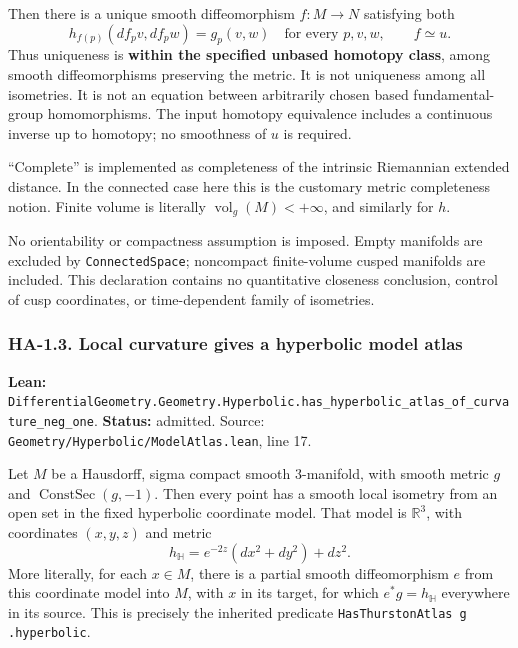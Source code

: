 \documentclass[
  letterpaper,
  11pt]{article}
\begin{document}
Then there is a unique smooth diffeomorphism \(f:M\to N\) satisfying
both \[
 h_{f(p)}(df_pv,df_pw)=g_p(v,w)
 \quad\text{for every }p,v,w,
 \qquad f\simeq u.
\] Thus uniqueness is \textbf{within the specified unbased homotopy
class}, among smooth diffeomorphisms preserving the metric. It is not
uniqueness among all isometries. It is not an equation between
arbitrarily chosen based fundamental-group homomorphisms. The input
homotopy equivalence includes a continuous inverse up to homotopy; no
smoothness of \(u\) is required.

``Complete'' is implemented as completeness of the intrinsic Riemannian
extended distance. In the connected case here this is the customary
metric completeness notion. Finite volume is literally
\(\operatorname{vol}_g(M)<+\infty\), and similarly for \(h\).

No orientability or compactness assumption is imposed. Empty manifolds
are excluded by {\small\texttt{Connected\allowbreak{}Space}}; noncompact
finite-volume cusped manifolds are included. This declaration contains
no quantitative closeness conclusion, control of cusp coordinates, or
time-dependent family of isometries.

\subsubsection{HA-1.3. Local curvature gives a hyperbolic model
atlas}\label{ha-1-3}

\textbf{Lean:}
{\small\texttt{Differential\allowbreak{}Geometry.\allowbreak{}Geometry.\allowbreak{}Hyperbolic.\allowbreak{}has\_\allowbreak{}hyperbolic\_\allowbreak{}atlas\_\allowbreak{}of\_\allowbreak{}curvature\_\allowbreak{}neg\_\allowbreak{}one}}.
\textbf{Status:} admitted. Source:
{\small\texttt{Geometry/\allowbreak{}Hyperbolic/\allowbreak{}Model\allowbreak{}Atlas.\allowbreak{}lean}},
line 17.

Let \(M\) be a Hausdorff, sigma compact smooth 3-manifold, with smooth
metric \(g\) and \(\operatorname{ConstSec}(g,-1)\). Then every point has
a smooth local isometry from an open set in the fixed hyperbolic
coordinate model. That model is \(\mathbb R^3\), with coordinates
\((x,y,z)\) and metric \[
 h_{\mathbb H}=e^{-2z}(dx^2+dy^2)+dz^2.
\] More literally, for each \(x\in M\), there is a partial smooth
diffeomorphism \(e\) from this coordinate model into \(M\), with \(x\)
in its target, for which \(e^*g=h_{\mathbb H}\) everywhere in its
source. This is precisely the inherited predicate
{\small\texttt{Has\allowbreak{}Thurston\allowbreak{}Atlas g .\allowbreak{}hyperbolic}}.
\end{document}
